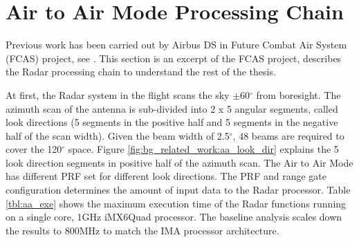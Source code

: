 
\section{Air to Air Mode Processing Chain}
\label{sec:bg_related_work:proc_chain}
Previous work has been carried out by Airbus DS in Future Combat Air System (FCAS) project, see \cite{fcas}. This section is an excerpt of the FCAS project, describes the Radar processing chain to understand the rest of the thesis.

At first, the Radar system in the flight scans the sky $\pm$60$^{\circ}$ from boresight. The azimuth scan of the antenna is sub-divided into 2 x 5 angular segments, called look directions (5 segments in the positive half and 5 segments in the negative half of the scan width). Given the beam width of 2.5$^{\circ}$, 48 beams are required to cover the 120$^{\circ}$ space. Figure \ref{fig:bg_related_work:aa_look_dir} explains the 5 look direction segments in positive half of the azimuth scan. The Air to Air Mode has different PRF set for different look directions. The PRF and range gate configuration determines the amount of input data to the Radar processor. Table \ref{tbl:aa_exe} shows the maximum execution time of the Radar functions running on a single core, 1GHz iMX6Quad processor. The baseline analysis scales down the results to 800MHz to match the IMA processor architecture.

